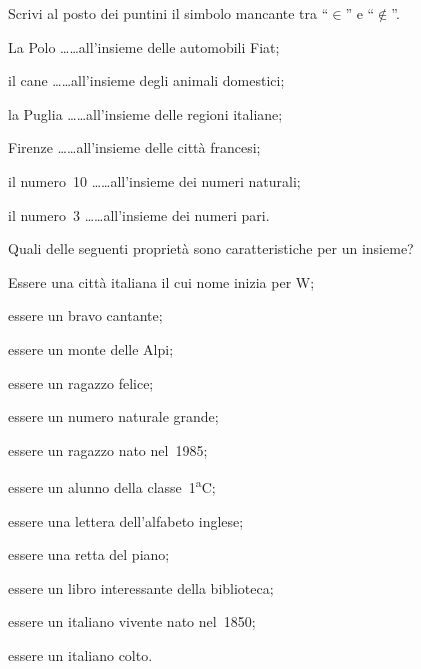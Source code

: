 \begin{esercizio}
\label{ese:5.6}
Scrivi al posto dei puntini il simbolo mancante tra ``$\in$'' e ``$\notin$''.

\begin{enumeratea}
\item La Polo \ldots\ldots all'insieme delle automobili Fiat;
\item il cane \ldots\ldots all'insieme degli animali domestici;
\item la Puglia \ldots\ldots all'insieme delle regioni italiane;
\item Firenze \ldots\ldots all'insieme delle città francesi;
\item il numero~10 \ldots\ldots all'insieme dei numeri naturali;
\item il numero~3 \ldots\ldots all'insieme dei numeri pari.
\end{enumeratea}
\end{esercizio}
\pagebreak
\begin{esercizio}
\label{ese:5.7}
Quali delle seguenti proprietà sono caratteristiche per un insieme?
\TabPositions{8.5cm}
\begin{enumeratea}
\item Essere una città italiana il cui nome inizia per W; \tab\boxV\quad\boxF
\item essere un bravo cantante; \tab\boxV\quad\boxF
\item essere un monte delle Alpi;  \tab\boxV\quad\boxF
\item essere un ragazzo felice; \tab\boxV\quad\boxF
\item essere un numero naturale grande;\tab\boxV\quad\boxF
\item essere un ragazzo nato nel~1985; \tab\boxV\quad\boxF
\item essere un alunno della classe~1\textsuperscript{a}C; \tab\boxV\quad\boxF
\item essere una lettera dell'alfabeto inglese; \tab\boxV\quad\boxF
\item essere una retta del piano; \tab\boxV\quad\boxF
\item essere un libro interessante della biblioteca; \tab\boxV\quad\boxF
\item essere un italiano vivente nato nel~1850; \tab\boxV\quad\boxF
\item essere un italiano colto. \tab\boxV\quad\boxF
\end{enumeratea}
\end{esercizio}

